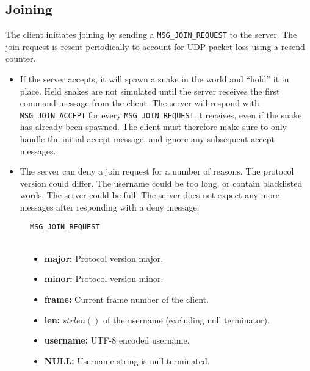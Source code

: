 \subsection{Joining}

\begin{center}

\end{center}

The  client  initiates  joining  by  sending  a \verb$MSG_JOIN_REQUEST$ to the
server.  The  join  request is resent periodically to account for  UDP  packet
loss using a resend counter.

\begin{itemize}
\item If the server accepts, it  will  spawn a snake in the world and ``hold''
it in place. Held snakes are not simulated until the server receives the first
command   message   from   the   client.   The   server  will   respond   with
\verb$MSG_JOIN_ACCEPT$ for every \verb$MSG_JOIN_REQUEST$ it receives, even  if
the  snake has already been spawned. The client must therefore  make  sure  to
only  handle  the  initial  accept  message,  and ignore any subsequent accept
messages.
\item The server can deny a join request for a number of reasons. The protocol
version could differ. The  username  could be too long, or contain blacklisted
words. The  server could be full. The server does not expect any more messages
after responding with a deny message.
\end{itemize}

\vspace{1.5em}

\begin{figure}[h]
\verb$MSG_JOIN_REQUEST$\\
\vspace{.25em}\\

\begin{itemize}
    \item\textbf{major:} Protocol version major.
    \item\textbf{minor:} Protocol version minor.
    \item\textbf{frame:} Current frame number of the client.
    \item\textbf{len:} $strlen()$ of the username (excluding null terminator).
    \item\textbf{username:} UTF-8 encoded username.
    \item\textbf{NULL:} Username string is null terminated.
\end{itemize}
\end{figure}


